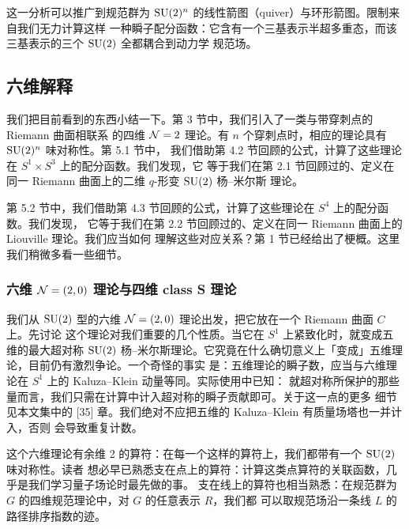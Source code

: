 这一分析可以推广到规范群为 $\mathrm{SU}(2)^n$ 的线性箭图（quiver）与环形箭图。限制来自我们无力计算这样
一种瞬子配分函数：它含有一个三基表示半超多重态，而该三基表示的三个 $\mathrm{SU}(2)$ 全都耦合到动力学
规范场。

\subsection{六维解释}

我们把目前看到的东西小结一下。第 3 节中，我们引入了一类与带穿刺点的 Riemann 曲面相联系
的四维 $\mathcal{N}=2$ 理论。有 $n$ 个穿刺点时，相应的理论具有 $\mathrm{SU}(2)^n$ 味对称性。第 5.1 节中，
我们借助第 4.2 节回顾的公式，计算了这些理论在 $S^1\times S^3$ 上的配分函数。我们发现，它
等于我们在第 2.1 节回顾过的、定义在同一 Riemann 曲面上的二维 $q$-形变 $\mathrm{SU}(2)$ 杨--米尔斯
理论。

第 5.2 节中，我们借助第 4.3 节回顾的公式，计算了这些理论在 $S^4$ 上的配分函数。我们发现，
它等于我们在第 2.2 节回顾过的、定义在同一 Riemann 曲面上的 Liouville 理论。我们应当如何
理解这些对应关系？第 1 节已经给出了梗概。这里我们稍微多看一些细节。

\subsubsection{六维 $\mathcal{N}=(2,0)$ 理论与四维 class S 理论}

我们从 $\mathrm{SU}(2)$ 型的六维 $\mathcal{N}=(2,0)$ 理论出发，把它放在一个 Riemann 曲面 $C$ 上。先讨论
这个理论对我们重要的几个性质。当它在 $S^1$ 上紧致化时，就变成五维的最大超对称 $\mathrm{SU}(2)$
杨--米尔斯理论。它究竟在什么确切意义上「变成」五维理论，目前仍有激烈争论。一个奇怪的事实
是：五维理论的瞬子数，应当与六维理论在 $S^1$ 上的 Kaluza--Klein 动量等同。实际使用中已知：
就超对称所保护的那些量而言，我们只需在计算中计入超对称的瞬子贡献即可。关于这一点的更多
细节见本文集中的 [35] 章。我们绝对不应把五维的 Kaluza--Klein 有质量场塔也一并计入，否则
会导致重复计数。


这个六维理论有余维 2 的算符：在每一个这样的算符上，我们都带有一个 $\mathrm{SU}(2)$ 味对称性。读者
想必早已熟悉支在点上的算符：计算这类点算符的关联函数，几乎是我们学习量子场论时最先做的事。
支在线上的算符也相当熟悉：在规范群为 $G$ 的四维规范理论中，对 $G$ 的任意表示 $R$，我们都
可以取规范场沿一条线 $L$ 的路径排序指数的迹。

